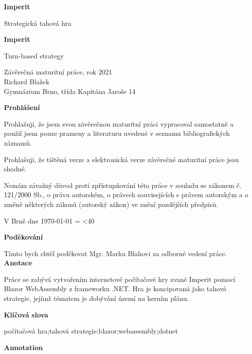 \documentclass[a4paper,12pt]{article}
\author{Richard Blažek}
\makeatletter
\newcommand{\repeatchar}[2]{%
  \begingroup
  \my@repeat@count=\z@
  \@whilenum\my@repeat@count<#1\do{#2\advance\my@repeat@count\@ne}%
  \endgroup
}
\makeatother
\begin{document}
\begin{titlepage}
    \begin{center}

	\vspace*{3cm}            
	\Huge
	\textbf{Imperit}
            
	\vspace{0.5cm}
	\LARGE
	Strategická tahová hra
        
	\vspace*{1cm}
	\Huge
	\textbf{Imperit}
            
	\vspace{0.5cm}
	\LARGE
	Turn-based strategy
            
	\vfill
            
	\large
        Závěrečná maturitní práce, rok 2021\\
	Richard Blažek\\
	Gymnázium Brno, třída Kapitána Jaroše 14
    \end{center}
\end{titlepage}
\thispagestyle{empty}
\Large\textbf{Prohlášení}\normalsize

Prohlašuji, že jsem svou závěrečnou maturitní práci vypracoval samostatně a použil jsem pouze prameny a literaturu uvedené v seznamu bibliografických záznamů.

Prohlašuji, že tištěná verze a elektronická verze závěrečné maturitní práce jsou shodné.

Nemám závažný důvod proti zpřístupňování této práce v souladu se zákonem č. 121/2000 Sb., o právu autorském, o právech souvisejících s právem autorským a o změně některých zákonů (autorský zákon) ve znění pozdějších předpisů. 

V Brně dne \today{} \repeatchar{40}{.}
\newpage
\thispagestyle{empty}
\Large\textbf{Poděkování}\normalsize

Tímto bych chtěl poděkovat Mgr. Marku Blahovi za odborné vedení práce.
\newpage
\thispagestyle{empty}
\Large\textbf{Anotace}\normalsize

Práce se zabývá vytvořením internetové počítačové hry zvané Imperit pomocí Blazor WebAssembly z frameworku .NET. Hra je koncipovaná jako tahová strategie, jejímž tématem je dobývání území na herním plánu.

\Large\textbf{Klíčová slova}\normalsize

počítačová hra;tahová strategie;blazor;webassembly;dotnet

\Large\textbf{Annotation}\normalsize
\end{document}
